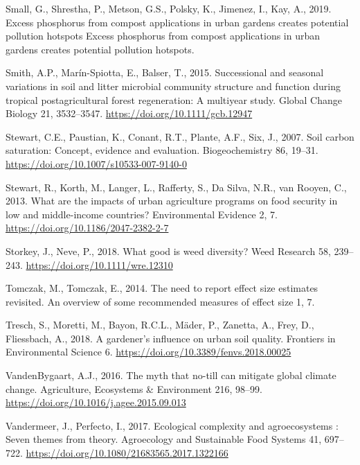 \documentclass[
  12pt,
]{article}
\newlength{\cslhangindent}
\newlength{\cslentryspacingunit} %
\newenvironment{CSLReferences}[2] %
 {%
  \setlength{\parindent}{0pt}
  \ifodd #1
  \let\oldpar\par
  \def\par{\hangindent=\cslhangindent\oldpar}
  \fi
  \setlength{\parskip}{#2\cslentryspacingunit}
 }%
 {}
\begin{document}
\begin{CSLReferences}{1}{0}
\leavevmode{}%
Small, G., Shrestha, P., Metson, G.S., Polsky, K., Jimenez, I., Kay, A., 2019. Excess phosphorus from compost applications in urban gardens creates potential pollution hotspots {Excess} phosphorus from compost applications in urban gardens creates potential pollution hotspots.

\leavevmode{}%
Smith, A.P., Marín-Spiotta, E., Balser, T., 2015. Successional and seasonal variations in soil and litter microbial community structure and function during tropical postagricultural forest regeneration: {A} multiyear study. Global Change Biology 21, 3532--3547. \url{https://doi.org/10.1111/gcb.12947}

\leavevmode{}%
Stewart, C.E., Paustian, K., Conant, R.T., Plante, A.F., Six, J., 2007. Soil carbon saturation: Concept, evidence and evaluation. Biogeochemistry 86, 19--31. \url{https://doi.org/10.1007/s10533-007-9140-0}

\leavevmode{}%
Stewart, R., Korth, M., Langer, L., Rafferty, S., Da Silva, N.R., van Rooyen, C., 2013. What are the impacts of urban agriculture programs on food security in low and middle-income countries? Environmental Evidence 2, 7. \url{https://doi.org/10.1186/2047-2382-2-7}

\leavevmode{}%
Storkey, J., Neve, P., 2018. What good is weed diversity? Weed Research 58, 239--243. \url{https://doi.org/10.1111/wre.12310}

\leavevmode{}%
Tomczak, M., Tomczak, E., 2014. The need to report effect size estimates revisited. {An} overview of some recommended measures of effect size 1, 7.

\leavevmode{}%
Tresch, S., Moretti, M., Bayon, R.C.L., Mäder, P., Zanetta, A., Frey, D., Fliessbach, A., 2018. A gardener's influence on urban soil quality. Frontiers in Environmental Science 6. \url{https://doi.org/10.3389/fenvs.2018.00025}

\leavevmode{}%
VandenBygaart, A.J., 2016. The myth that no-till can mitigate global climate change. Agriculture, Ecosystems \& Environment 216, 98--99. \url{https://doi.org/10.1016/j.agee.2015.09.013}

\leavevmode{}%
Vandermeer, J., Perfecto, I., 2017. Ecological complexity and agroecosystems : Seven themes from theory. Agroecology and Sustainable Food Systems 41, 697--722. \url{https://doi.org/10.1080/21683565.2017.1322166}


\end{CSLReferences}
\end{document}
